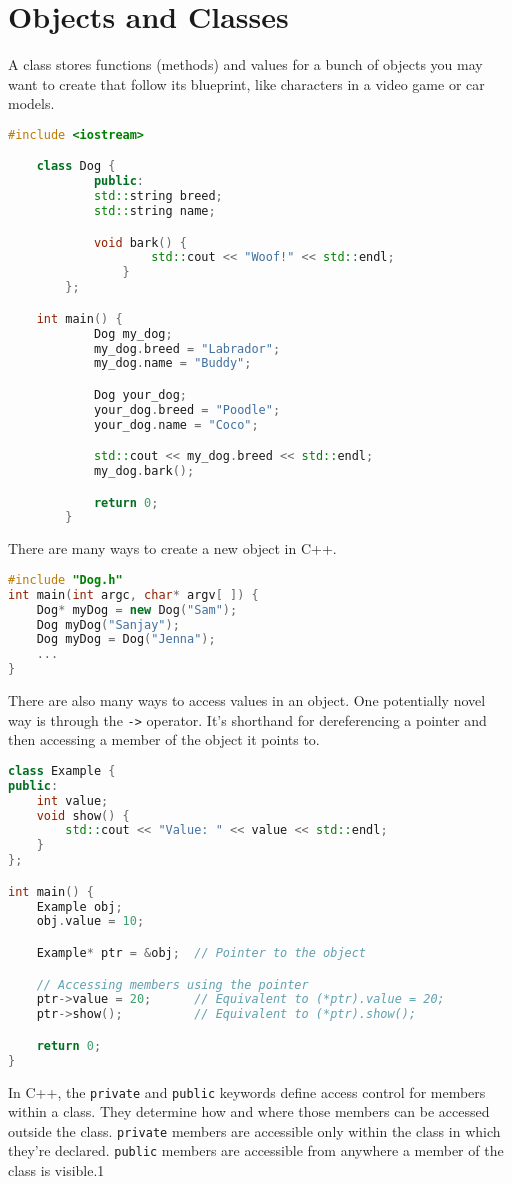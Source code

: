 \section{Objects and Classes}
A class stores functions (methods) and values for a bunch
of objects you may want to create that follow its blueprint,
like characters in a video game or car models.

\begin{lstlisting}[language=C++,caption=Objects and Classes]
    #include <iostream>

    class Dog {
            public:
            std::string breed;
            std::string name;

            void bark() {
                    std::cout << "Woof!" << std::endl;
                }
        };

    int main() {
            Dog my_dog;
            my_dog.breed = "Labrador";
            my_dog.name = "Buddy";

            Dog your_dog;
            your_dog.breed = "Poodle";
            your_dog.name = "Coco";

            std::cout << my_dog.breed << std::endl;
            my_dog.bark();

            return 0;
        }
\end{lstlisting}

There are many ways to create a new object in C++.

\begin{lstlisting}[language=C++,caption=Alternative Instantiations]
#include "Dog.h"
int main(int argc, char* argv[ ]) {
    Dog* myDog = new Dog("Sam");
    Dog myDog("Sanjay");
    Dog myDog = Dog("Jenna");
    ...
}
\end{lstlisting}

There are also many ways to access values in an object.
One potentially novel way is through the \texttt{->} operator.
It's shorthand for dereferencing a pointer and then accessing
a member of the object it points to.
\begin{lstlisting}[language=C++,caption=-> Operator]
class Example {
public:
    int value;
    void show() {
        std::cout << "Value: " << value << std::endl;
    }
};

int main() {
    Example obj;
    obj.value = 10;

    Example* ptr = &obj;  // Pointer to the object

    // Accessing members using the pointer
    ptr->value = 20;      // Equivalent to (*ptr).value = 20;
    ptr->show();          // Equivalent to (*ptr).show();

    return 0;
}
\end{lstlisting}

In C++, the \texttt{private} and \texttt{public} keywords define access
control for members within a class. They determine how and where those
members can be accessed outside the class. \texttt{private} members are
accessible only within the class in which they're declared. \texttt{public}
members are accessible from anywhere a member of the class is visible.1
